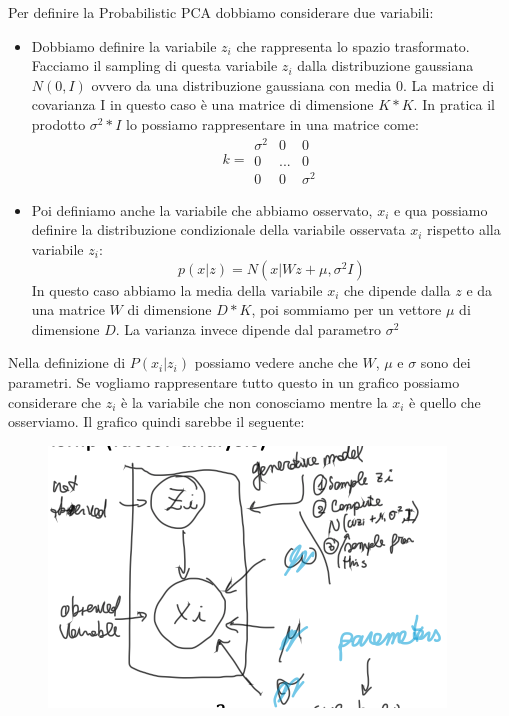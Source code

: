 \documentclass[14pt]{extreport}
\begin{document}
Per definire la Probabilistic PCA dobbiamo considerare due variabili:
\begin{itemize}
	\item Dobbiamo definire la variabile $z_i$ che rappresenta lo spazio trasformato. Facciamo il sampling di questa variabile $z_i$ 
	dalla distribuzione gaussiana $N(0,I)$ ovvero da una distribuzione gaussiana con media 0. La matrice di covarianza I in questo caso è una matrice di 
	dimensione $K*K$.
	In pratica il prodotto $\sigma^2*I$ lo possiamo rappresentare in una matrice come:
	\begin{equation}
		k = \begin{matrix}
		\sigma^2 & 0 & 0\\
		0 & ... & 0\\
		0 & 0 & \sigma^2
		\end{matrix}
		\end{equation}
	\item Poi definiamo anche la variabile che abbiamo osservato, $x_i$ e qua possiamo definire la distribuzione condizionale della variabile osservata
	$x_i$ rispetto alla variabile $z_i$: $$p(x|z) = N(x|Wz + \mu, \sigma^2I)$$
	In questo caso abbiamo la media della variabile $x_i$ che dipende dalla $z$ e da una matrice $W$ di dimensione $D*K$, poi sommiamo per un vettore $\mu$ 
	di dimensione $D$. La varianza invece dipende dal parametro $\sigma^2$
\end{itemize}

Nella definizione di $P(x_i|z_i)$ possiamo vedere anche che $W$, $\mu$ e $\sigma$ sono dei parametri.
Se vogliamo rappresentare tutto questo in un grafico possiamo considerare che $z_i$ è la variabile che non conosciamo mentre la $x_i$ è quello che osserviamo.
Il grafico quindi sarebbe il seguente:


\begin{figure}[H] 
\centering
\includegraphics[width=0.7\linewidth]{482.jpeg}
\end{figure}
\end{document}
